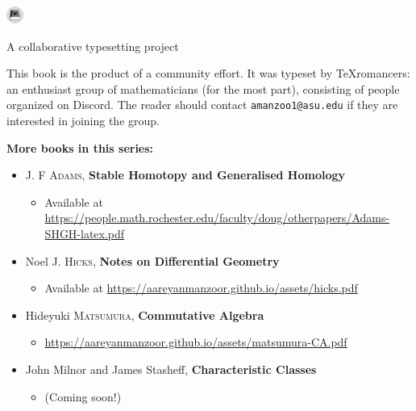 \documentclass[../main]{subfiles}
\begin{document}

\newpage
\thispagestyle{empty}

\begin{center}
    \Huge{
    \includegraphics[height=1.5em]{texromancers_gray.pdf}
    }
    
    \normalsize{A collaborative typesetting project}
\end{center}

\noindent\makebox[\linewidth]{\rule{\linewidth}{0.4pt}}

\bigskip

This book is the product of a community effort. It was typeset by \TeX{}romancers: an enthusiast group of mathematicians (for the most part), consisting of people organized on Discord. The reader should contact \texttt{amanzoo1@asu.edu} if they are interested in joining the group.

\noindent\makebox[\linewidth]{\rule{\linewidth}{0.4pt}}

\bigskip

\noindent\textbf{More books in this series:}
\begin{itemize}
    \item J. F \textsc{Adams}, \textbf{Stable Homotopy and Generalised Homology}
        \begin{itemize}
            \item Available at \url{https://people.math.rochester.edu/faculty/doug/otherpapers/Adams-SHGH-latex.pdf}
        \end{itemize}
    \item Noel J. \textsc{Hicks}, \textbf{Notes on Differential Geometry}
        \begin{itemize}
            \item Available at \url{https://aareyanmanzoor.github.io/assets/hicks.pdf}
        \end{itemize}
    \item Hideyuki \textsc{Matsumura}, \textbf{Commutative Algebra}
        \begin{itemize}
            \item \url{https://aareyanmanzoor.github.io/assets/matsumura-CA.pdf}
        \end{itemize}
    \item John Milnor and James Stasheff, \textbf{Characteristic Classes}
    \begin{itemize}
        \item (Coming soon!)
    \end{itemize}
\end{itemize}

\vfill
\end{document}
